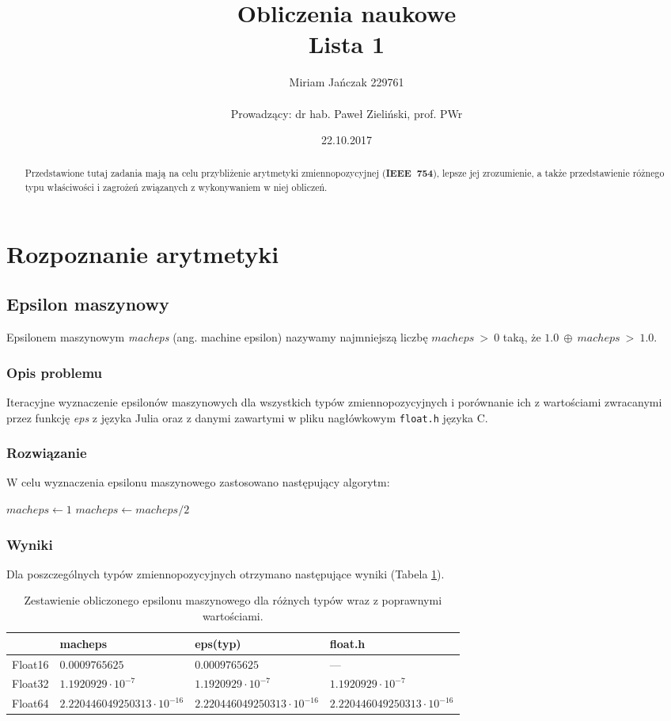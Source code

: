 \documentclass[11pt,a4paper]{article}
\title{Obliczenia naukowe\\Lista 1}
\author{Miriam Jańczak 229761\\ \\Prowadzący: dr hab. Paweł Zieliński, prof. PWr}
\date{22.10.2017}
\begin{document}
\maketitle
\begin{abstract}
\noindent Przedstawione tutaj zadania mają na celu przybliżenie arytmetyki zmiennopozycyjnej (\textbf{IEEE~754}), lepsze jej zrozumienie, a także przedstawienie różnego typu właściwości i zagrożeń związanych z wykonywaniem w niej obliczeń.
\end{abstract}
\section{Rozpoznanie arytmetyki}
\subsection{Epsilon maszynowy}
Epsilonem maszynowym \emph{macheps} (ang. machine epsilon) nazywamy najmniejszą liczbę $macheps~>~0$ taką, że $1.0~\oplus~macheps~>~1.0$.
\subsubsection{Opis problemu}
Iteracyjne wyznaczenie epsilonów maszynowych dla wszystkich typów zmiennopozycyjnych i porównanie ich z wartościami zwracanymi przez funkcję \emph{eps} z języka Julia oraz z danymi zawartymi w pliku nagłówkowym \texttt{float.h} języka C.
\subsubsection{Rozwiązanie}
W celu wyznaczenia epsilonu maszynowego zastosowano następujący algorytm:
\begin{algorithmic}
\State $macheps\gets 1$
    \State $macheps\gets macheps/{2}$
\EndWhile
\end{algorithmic}
\subsubsection{Wyniki}
Dla poszczególnych typów zmiennopozycyjnych otrzymano następujące wyniki (Tabela \ref{table:1}).
\begin{table}[!h]
\centering
\begin{tabular}{l | l | l | l}
& macheps & eps(typ) & float.h \\ \hline
Float16 & $0.0009765625$ & $0.0009765625$ & --- \\
Float32 & $1.1920929\cdot 10^{-7}$ & $1.1920929\cdot 10^{-7}$ & $1.1920929\cdot 10^{-7}$ \\
Float64 & $2.220446049250313\cdot 10^{-16}$ & $2.220446049250313\cdot 10^{-16}$ & $2.220446049250313\cdot 10^{-16}$ \\
\end{tabular}
\caption{\label{table:1}Zestawienie obliczonego epsilonu maszynowego dla różnych typów wraz z poprawnymi wartościami.}
\end{table}
\end{document}
